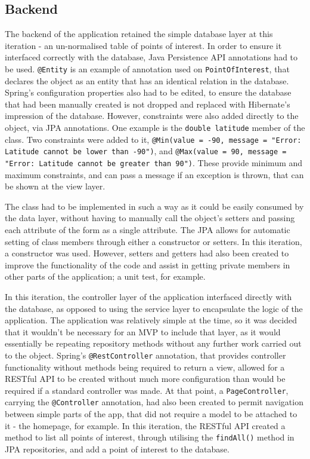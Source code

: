 \subsection{Backend}

The backend of the application retained the simple database layer at this iteration - an un-normalised table of points of interest. In order to ensure it interfaced correctly with the database, Java Persistence API annotations had to be used. \texttt{@Entity} is an example of annotation used on \texttt{PointOfInterest}, that declares the object as an entity that has an identical relation in the database. Spring's configuration properties also had to be edited, to ensure the database that had been manually created is not dropped and replaced with Hibernate's impression of the database. However, constraints were also added directly to the object, via JPA annotations. One example is the \texttt{double latitude} member of the class. Two constraints were added to it, \texttt{@Min(value = -90, message = "Error: Latitude cannot be lower than -90")}, and \texttt{@Max(value = 90, message = "Error: Latitude cannot be greater than 90")}. These provide minimum and maximum constraints, and can pass a message if an exception is thrown, that can be shown at the view layer.

The class had to be implemented in such a way as it could be easily consumed by the data layer, without having to manually call the object's setters and passing each attribute of the form as a single attribute. The JPA allows for automatic setting of class members through either a constructor or setters. In this iteration, a constructor was used. However, setters and getters had also been created to improve the functionality of the code and assist in getting private members in other parts of the application; a unit test, for example.

In this iteration, the controller layer of the application interfaced directly with the database, as opposed to using the service layer to encapsulate the logic of the application. The application was relatively simple at the time, so it was decided that it wouldn't be necessary for an MVP to include that layer, as it would essentially be repeating repository methods without any further work carried out to the object. Spring's \texttt{@RestController} annotation, that provides controller functionality without methods being required to return a view, allowed for a RESTful API to be created without much more configuration than would be required if a standard controller was made. At that point, a \texttt{PageController}, carrying the \texttt{@Controller} annotation, had also been created to permit navigation between simple parts of the app, that did not require a model to be attached to it - the homepage, for example. In this iteration, the RESTful API created a method to list all points of interest, through utilising the \texttt{findAll()} method in JPA repositories, and add a point of interest to the database.

